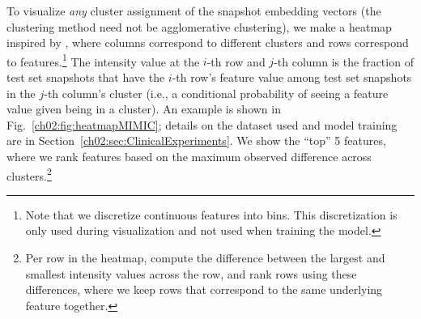 To visualize \emph{any} cluster assignment of the snapshot embedding vectors (the clustering method need not be agglomerative clustering), we make a heatmap inspired by \citet{li2020neural}, where columns correspond to different clusters and rows correspond to features.\footnote{Note that we discretize continuous features into bins. This discretization is only used during visualization and not used when training the \mbox{} model.} The intensity value at the $i$-th row and $j$-th column is the fraction of test set snapshots that have the $i$-th row's feature value among test set snapshots in the $j$-th column's cluster (i.e., a conditional probability of seeing a feature value given being in a cluster).
An example is shown in Fig.~\ref{ch02:fig:heatmapMIMIC}; details on the dataset used and model training are in Section~\ref{ch02:sec:ClinicalExperiments}. 
We show the ``top'' 5 features,
where we rank features based on the maximum observed difference across clusters.\footnote{Per row in the heatmap, compute the difference between the largest and smallest intensity values across the row, and rank rows using these differences, where we keep rows that correspond to the same underlying feature together.}


